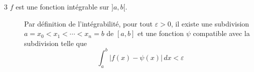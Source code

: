 \documentclass[a4paper, 12pt]{article}
\begin{document}
\begin{demonstration}
\begin{description}
        \item[{3 $f$ est une fonction intégrable sur $]a, b[$.}]
        
        Par définition de l'intégrabilité, pour tout $\varepsilon > 0$, il existe une subdivision $a = x_0 < x_1 < \cdots < x_n = b$ de $[a, b]$
        et une fonction $\psi$ compatible avec la subdivision telle que
        $$
        \int_a^b |f(x) - \psi(x)| \, dx < \varepsilon
        $$
    \end{description}
\end{demonstration}
\end{document}
